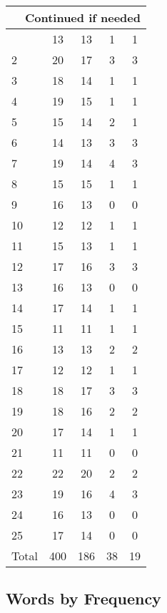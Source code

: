 \begin{center}
\begin{longtable}{l|c|c|c|c}
\hline \multicolumn{5}{|r|}{{Continued if needed}} \\ \hline
\endfoot 
1 & 13 & 13 & 1 & 1\\ \hline
2 & 20 & 17 & 3 & 3\\ \hline
3 & 18 & 14 & 1 & 1\\ \hline
4 & 19 & 15 & 1 & 1\\ \hline
5 & 15 & 14 & 2 & 1\\ \hline
6 & 14 & 13 & 3 & 3\\ \hline
7 & 19 & 14 & 4 & 3\\ \hline
8 & 15 & 15 & 1 & 1\\ \hline
9 & 16 & 13 & 0 & 0\\ \hline
10 & 12 & 12 & 1 & 1\\ \hline
11 & 15 & 13 & 1 & 1\\ \hline
12 & 17 & 16 & 3 & 3\\ \hline
13 & 16 & 13 & 0 & 0\\ \hline
14 & 17 & 14 & 1 & 1\\ \hline
15 & 11 & 11 & 1 & 1\\ \hline
16 & 13 & 13 & 2 & 2\\ \hline
17 & 12 & 12 & 1 & 1\\ \hline
18 & 18 & 17 & 3 & 3\\ \hline
19 & 18 & 16 & 2 & 2\\ \hline
20 & 17 & 14 & 1 & 1\\ \hline
21 & 11 & 11 & 0 & 0\\ \hline
22 & 22 & 20 & 2 & 2\\ \hline
23 & 19 & 16 & 4 & 3\\ \hline
24 & 16 & 13 & 0 & 0\\ \hline
25 & 17 & 14 & 0 & 0\\ \hline
\hline \hline
Total & 400 & 186 & 38 & 19




\end{longtable}
\end{center}



\subsection{Words by Frequency}


